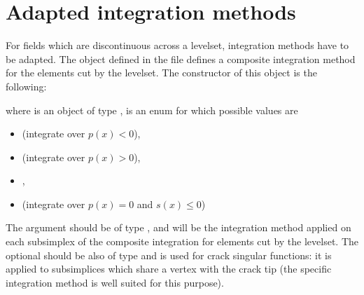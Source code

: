 \documentclass[a4paper,11pt,english]{sphinxmanual}
\begin{document}
\section{Adapted integration methods}
\label{\detokenize{userdoc/xfem:adapted-integration-methods}}
For fields which are discontinuous across a level\sphinxhyphen{}set, integration methods have
to be adapted. The object  defined in the file
 defines a composite integration method
for the elements cut by the level\sphinxhyphen{}set. The constructor of this object is the
following:

\begin{sphinxVerbatim}[commandchars=\\\{\}]
        
\end{sphinxVerbatim}

where  is an object of type ,  is an enum for which
possible values are
\begin{itemize}
\item {} 
 (integrate over \(p(x)<0\)),

\item {} 
 (integrate over \(p(x)>0\)),

\item {} 
,

\item {} 
 (integrate over \(p(x)=0\)
and \(s(x)\leq 0\))

\end{itemize}

The argument  should be of type , and will be
the integration method applied on each sub\sphinxhyphen{}simplex of the composite integration
for elements cut by the level\sphinxhyphen{}set. The optional  should be also of
type  and is used for crack singular functions: it is
applied to sub\sphinxhyphen{}simplices which share a vertex with the crack tip (the specific
integration method  is well suited for this purpose).
\end{document}

